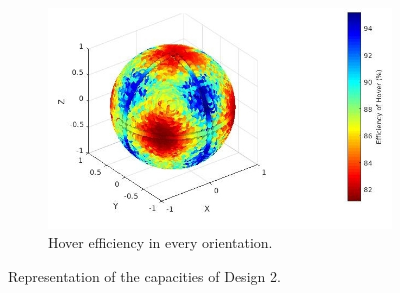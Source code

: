 \begin{figure}[!h]
{\begin{subfigure}[b]{0.5\textwidth}
  \end{subfigure}
  \begin{subfigure}[b]{0.45\textwidth}
    \includegraphics[width=\linewidth]{images/Quad_design_2_hspace.jpg}
    \caption{Hover efficiency in every orientation.} \label{fig:deisgn2_hspace}
  \end{subfigure}}
  \caption{Representation of the capacities of Design 2.}
  \label{fig:Quadcopter2_spaces}
\end{figure}

\begin{table}[!h]
\begin{center}
 \caption{Comparison between the two designs' force capabilities.}\vspace{1ex}
 \label{tab:tab_Quad_compare_force}
\end{center}
\end{table}

\begin{table}[!h]
\begin{center}
 \caption{Comparison between the two designs' torque capabilities.}\vspace{1ex}
 \label{tab:tab_Quad_compare_torque}
\end{center}
\end{table}

